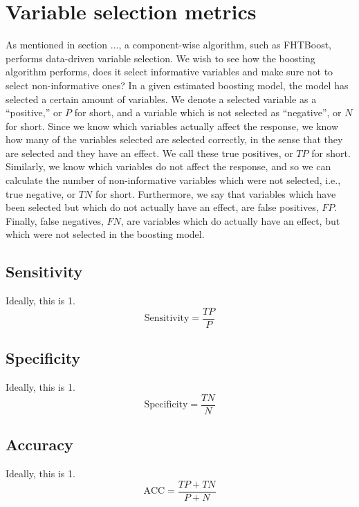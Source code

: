 \section{Variable selection metrics}
As mentioned in section ..., a component-wise algorithm, such as FHTBoost, performs data-driven variable selection.
We wish to see how the boosting algorithm performs, does it select informative variables and make sure not to select non-informative ones? 
In a given estimated boosting model, the model has selected a certain amount of variables.
We denote a selected variable as a ``positive,'' or $P$ for short, and a variable which is not selected as ``negative'', or $N$ for short.
Since we know which variables actually affect the response, we know how many of the variables selected are selected correctly, in the sense
that they are selected and they have an effect. We call these true positives, or $TP$ for short.
Similarly, we know which variables do not affect the response, and so we can calculate the number of non-informative variables
which were not selected, i.e., true negative, or $TN$ for short. Furthermore, we say that variables which have been selected
but which do not actually have an effect, are false positives, $FP$. Finally, false negatives, $FN$, are variables which do actually
have an effect, but which were not selected in the boosting model.

\subsection{Sensitivity}
Ideally, this is 1.
\begin{equation}\label{eq:sensitivity}
    \text{Sensitivity}=\frac{TP}{P}
\end{equation}

\subsection{Specificity}
Ideally, this is 1.
\begin{equation}\label{eq:specificity}
    \text{Specificity}=\frac{TN}{N}
\end{equation}

\subsection{Accuracy}
Ideally, this is 1.
\begin{equation}\label{eq:sensitivity}
    \text{ACC}=\frac{TP+TN}{P+N}
\end{equation}

